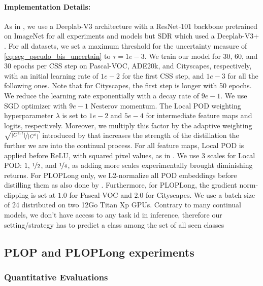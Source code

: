 \paragraph{Implementation Details:} As in \cite{cermelli2020modelingthebackground}, we use a
Deeplab-V3 \citep{chen2017deeplabv3} architecture with a ResNet-101 \citep{he2016resnet} backbone
pretrained on ImageNet \citep{deng2009imagenet} for all experiments and models but SDR
\citep{michieli2021sdr} which used a Deeplab-V3+ \citep{chen2018deeplabv3plus}. For all datasets, we
set a maximum threshold for the uncertainty measure of \autoref{eq:seg_pseudo_bis_uncertain} to
$\tau=1e-3$. We train our model for 30, 60, and 30 epochs per \ac{CSS} step on Pascal-VOC, ADE20k, and
Cityscapes, respectively, with an initial learning rate of $1e-2$ for the first \ac{CSS} step, and $1e-3$
for all the following ones. Note that for Cityscapes, the first step is longer with 50 epochs. We
reduce the learning rate exponentially with a decay rate of $9e-1$. We use SGD optimizer with $9e-1$
Nesterov momentum. The Local POD weighting hyperparameter $\lambda$ is set to $1e-2$ and $5e-4$ for
intermediate feature maps and logits, respectively. Moreover, we multiply this factor by the
adaptive weighting $\sqrt{\nicefrac{|C^{1:t}|}{|C^{t}|}}$ introduced by \citep{hou2019ucir} that
increases the strength of the distillation the further we are into the continual process. For all
feature maps, Local POD is applied before ReLU, with squared pixel values, as in
\cite{zagoruyko2016distillation_attention,douillard2020podnet}. We use 3 scales for Local POD: $1$,
$\nicefrac{1}{2}$, and $\nicefrac{1}{4}$, as adding more scales experimentally brought diminishing
returns. For PLOPLong only, we L2-normalize all POD embeddings before distilling them as also done
by \cite{douillard2020podnet}. Furthermore, for PLOPLong, the gradient norm-clipping is set at $1.0$
for Pascal-VOC and $2.0$ for Cityscapes. We use a batch size of 24 distributed on two 12Go Titan Xp
GPUs. Contrary to many continual models, we don't have access to any task id in inference, therefore
our setting/strategy has to predict a class among the set of all seen classes

\subsection{PLOP and PLOPLong experiments}
\label{sec:seg_plop_exp}

\subsubsection{Quantitative Evaluations}

